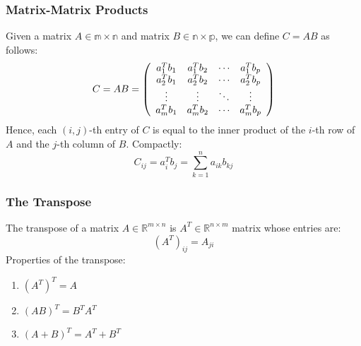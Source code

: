 \documentclass[twoside,twocolumn]{article}
\begin{document}
\subsubsection{Matrix-Matrix Products}
Given a matrix $A\in \mathbb{m \times n}$ and matrix $B \in \mathbb{n \times p}$,
we can define $C = AB$ as follows:
\begin{equation}
  C = AB = \left( \begin{array} { c c c c } { a _ { 1 } ^ { T } b _ { 1 } } & { a _ { 1 } ^ { T } b _ { 2 } } & { \cdots } & { a _ { 1 } ^ { T } b _ { p } } \\ { a _ { 2 } ^ { T } b _ { 1 } } & { a _ { 2 } ^ { T } b _ { 2 } } & { \cdots } & { a _ { 2 } ^ { T } b _ { p } } \\ { \vdots } & { \vdots } & { \ddots } & { \vdots } \\ { a _ { m } ^ { T } b _ { 1 } } & { a _ { m } ^ { T } b _ { 2 } } & { \cdots } & { a _ { m } ^ { T } b _ { p } } \end{array} \right)
\end{equation}
Hence, each $(i,j)$-th entry of $C$ is equal to the inner product of the $i$-th
row of $A$ and the $j$-th column of $B$. Compactly:
\begin{equation}
  C_{ij} = a_i^T b_j = \sum_{k=1}^n a_{ik} b_{kj}
\end{equation}
\subsubsection{The Transpose}
The transpose of a matrix $A\in \mathbb{R}^{m \times n}$ is
$A^T \in \mathbb{R}^{n \times m}$ matrix whose entries are:
\begin{equation}
  (A^T)_{ij} = A_{ji}
\end{equation}
Properties of the transpose:
\begin{enumerate}
  \item $(A^T)^T = A$
  \item $(AB)^T = B^T A^T$
  \item $(A + B)^T = A^T + B^T$
\end{enumerate}
\end{document}
